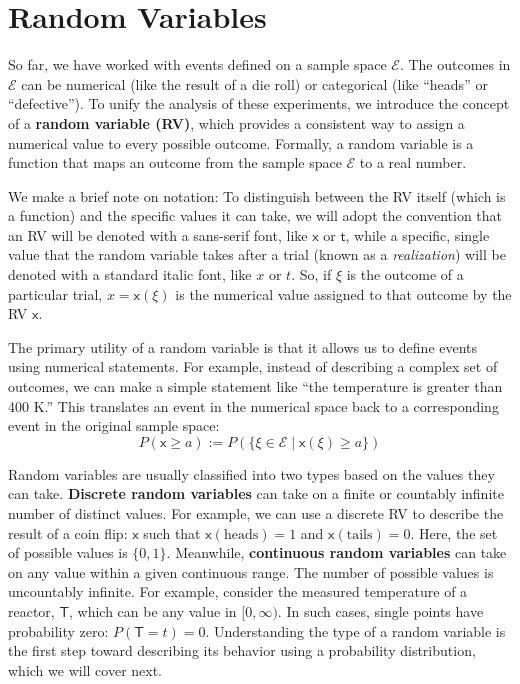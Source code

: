 \section{Random Variables}
So far, we have worked with events defined on a sample space $\mathcal{E}$. The outcomes in $\mathcal{E}$ can be numerical (like the result of a die roll) or categorical (like ``heads'' or ``defective''). To unify the analysis of these experiments, we introduce the concept of a \textbf{random variable (RV)}, which provides a consistent way to assign a numerical value to every possible outcome. Formally, a random variable is a function that maps an outcome from the sample space $\mathcal{E}$ to a real number.

We make a brief note on notation: To distinguish between the RV itself (which is a function) and the specific values it can take, we will adopt the convention that an RV will be denoted with a sans-serif font, like $\mathsf{x}$ or $\mathsf{t}$, while a specific, single value that the random variable takes after a trial (known as a \emph{realization}) will be denoted with a standard italic font, like $x$ or $t$. So, if $\xi$ is the outcome of a particular trial, $x = \mathsf{x}(\xi)$ is the numerical value assigned to that outcome by the RV $\mathsf{x}$.

The primary utility of a random variable is that it allows us to define events using numerical statements. For example, instead of describing a complex set of outcomes, we can make a simple statement like ``the temperature is greater than 400 K.'' This translates an event in the numerical space back to a corresponding event in the original sample space:
\begin{equation}
    P(\mathsf{x} \ge a) := P(\{\xi \in \mathcal{E} \mid \mathsf{x}(\xi) \ge a\})
\end{equation}

Random variables are usually classified into two types based on the values they can take. \textbf{Discrete random variables} can take on a finite or countably infinite number of distinct values. For example, we can use a discrete RV to describe the result of a coin flip: $\mathsf{x}$ such that $\mathsf{x}(\text{heads}) = 1$ and $\mathsf{x}(\text{tails}) = 0$. Here, the set of possible values is $\{0, 1\}$. Meanwhile, \textbf{continuous random variables} can take on any value within a given continuous range. The number of possible values is uncountably infinite. For example, consider the measured temperature of a reactor, $\mathsf{T}$, which can be any value in $[0, \infty)$. In such cases, single points have probability zero: $P(\mathsf{T}=t)=0$. Understanding the type of a random variable is the first step toward describing its behavior using a probability distribution, which we will cover next.

